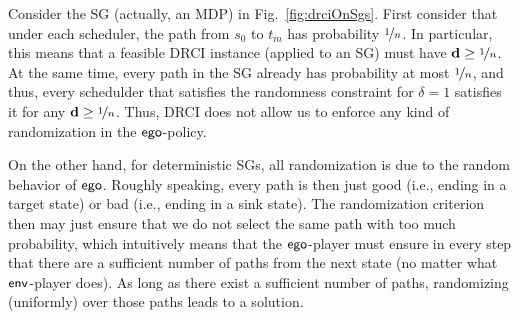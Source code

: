 {{{{\begin{figure}
\caption{}	
\end{figure}

\begin{example}
	Consider the SG (actually, an MDP) in Fig.~\ref{fig:drciOnSgs}. 
	First consider that under each scheduler, the path from $s_0$ to $t_m$ has probability $\nicefrac{1}{n}$. In particular, this means that a feasible DRCI instance (applied to an SG) must have $\mathbf{d} \geq \nicefrac{1}{n}$. At the same time, every path in the SG already has probability at most $\nicefrac{1}{n}$, and thus, every schedulder that satisfies the randomness constraint for $\delta = 1$ satisfies it for any $\mathbf{d} \geq \nicefrac{1}{n}$. Thus, DRCI does not allow us to enforce any kind of randomization in the $\mathsf{ego}$-policy. 
\end{example}

On the other hand, for deterministic SGs, all randomization is due to the random behavior of $\mathsf{ego}$. Roughly speaking, every path is then just good (i.e., ending in a target state) or bad (i.e., ending in a sink state). The randomization criterion then may just ensure that we do not select the same path with too much probability, which intuitively means that the $\mathsf{ego}$-player must ensure in every step that there are a sufficient number of paths from the next state (no matter what $\mathsf{env}$-player does). 
As long as there exist a sufficient number of paths, randomizing (uniformly) over those paths leads to a solution.

}}}}
